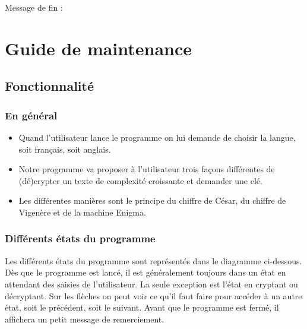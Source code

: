 \documentclass[a4paper,12pt,abstracton,titlepage]{scrartcl}
\begin{document}

Message de fin :

\vspace{0.5cm}
{		%
\label{FSQM}
}








\newpage
\section{Guide de maintenance}
\subsection{Fonctionnalité}
\subsubsection{En général}
\begin{itemize}
\item Quand l’utilisateur lance le programme on lui demande de choisir la langue, soit français, soit anglais.
\item Notre programme va proposer à l’utilisateur trois façons différentes de (dé)crypter un texte de complexité croissante et demander une clé.
\item Les différentes manières sont le principe du chiffre de César, du chiffre de Vigenère et de la machine Enigma.
\end{itemize}

\subsubsection{Différents états du programme}
Les différents états du programme sont représentés dans le diagramme ci-dessous. Dès que le programme est lancé, il est généralement toujours dans un état en attendant des saisies de l'utilisateur. La seule exception est l'état en cryptant ou décryptant.
Sur les flèches on peut voir ce qu'il faut faire pour accéder à un autre état, soit le précédent, soit le suivant.
Avant que le programme est fermé, il affichera un petit message de remerciement.\\
\end{document}
